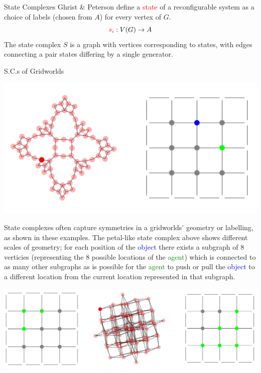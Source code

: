 \documentclass[a0paper,landscape, fontscale=0.4]{baposter}
\begin{document}
\begin{poster}
\begin{posterbox}[name=scs,below=reconfigsys,bottomaligned=message]{State Complexes}
Ghrist \& Peterson \cite{Ghrist-Peterson:2007} define a \textcolor{red}{state} of a reconfigurable system as a choice of labels (chosen from $A$) for every vertex of $G$.
\vspace{0.15cm}
$$\textcolor{red}{s_i}:V(G) \rightarrow A$$
The state complex $S$ is a graph with vertices corresponding to states, with edges connecting a pair states differing by a single generator.
\end{posterbox}



\begin{posterbox}[name=scsofgrids,column=4]{S.C.s of Gridworlds}
\begin{center}
    \includegraphics[width=1\textwidth]{petal-walk-1.PNG}
\end{center}

State complexes often capture symmetries in a gridworlds' geometry or labelling, as shown in these examples. The petal-like state complex above shows different scales of geometry; for each position of the \textcolor{blue}{object} there exists a subgraph of 8 verticies (representing the 8 possible locations of the \textcolor{green}{agent}) which is connected to as many other subgraphs as is possible for the \textcolor{green}{agent} to push or pull the \textcolor{blue}{object} to a different location from the current location represented in that subgraph.

\vspace{0.6cm}
\begin{center}
    \includegraphics[width=1\textwidth]{3-6-agents.PNG}
\end{center}


\end{posterbox}
\end{poster}
\end{document}
